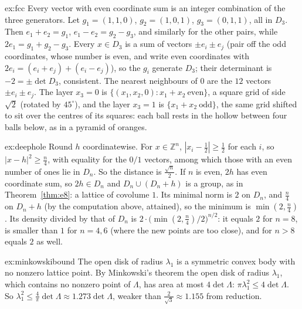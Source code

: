 \begin{solution}{ex:fcc}
\idea Every vector with even coordinate sum is an integer combination of the three generators.
\writeup Let $g_1=(1,1,0)$, $g_2=(1,0,1)$, $g_3=(0,1,1)$, all in $D_3$. Then $e_1+e_2=g_1$, $e_1-e_2=g_2-g_3$, and similarly for the other pairs, while $2e_1=g_1+g_2-g_3$.
Every $x\in D_3$ is a sum of vectors $\pm e_i\pm e_j$ (pair off the odd coordinates, whose number is even, and write even coordinates with $2e_i=(e_i+e_j)+(e_i-e_j)$),
so the $g_i$ generate $D_3$; their determinant is $-2=\pm\det D_3$, consistent. The nearest neighbours of $0$ are the $12$ vectors $\pm e_i\pm e_j$. The layer $x_3=0$
is $\{(x_1,x_2,0):x_1+x_2\ \text{even}\}$, a square grid of side $\sqrt2$ (rotated by $45^\circ$), and the layer $x_3=1$ is $\{x_1+x_2\ \text{odd}\}$, the same grid
shifted to sit over the centres of its squares: each ball rests in the hollow between four balls below, as in a pyramid of oranges.
\end{solution}

\begin{solution}{ex:deephole}
\idea Round $h$ coordinatewise.
\writeup For $x\in\mathbb Z^n$, $|x_i-\frac12|\ge\frac12$ for each $i$, so $|x-h|^2\ge\frac n4$, with equality for the $0/1$ vectors, among which those with an even
number of ones lie in $D_n$. So the distance is $\frac{\sqrt n}2$. If $n$ is even, $2h$ has even coordinate sum, so $2h\in D_n$ and $D_n\cup(D_n+h)$ is a group,
as in Theorem~\ref{thm:e8}: a lattice of covolume $1$. Its minimal norm is $2$ on $D_n$, and $\frac n4$ on $D_n+h$ (by the computation above, attained), so the
minimum is $\min(2,\frac n4)$. Its density divided by that of $D_n$ is $2\cdot\bigl(\min(2,\frac n4)/2\bigr)^{n/2}$: it equals $2$ for $n=8$, is smaller than $1$ for
$n=4,6$ (where the new points are too close), and for $n>8$ equals $2$ as well.
\end{solution}

\begin{solution}{ex:minkowskibound}
\idea The open disk of radius $\lambda_1$ is a symmetric convex body with no nonzero lattice point.
\writeup By Minkowski's theorem the open disk of radius $\lambda_1$, which contains no nonzero point of $\Lambda$, has area at most $4\det\Lambda$:
$\pi\lambda_1^2\le4\det\Lambda$. So
$\lambda_1^2\le\frac4\pi\det\Lambda\approx1.273\det\Lambda$, weaker than $\frac2{\sqrt3}\approx1.155$ from reduction.
\end{solution}

